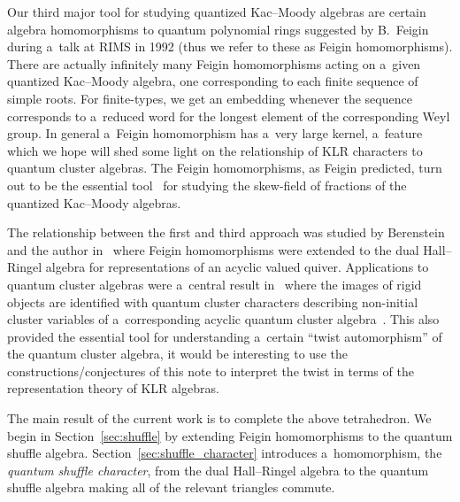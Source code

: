 \documentclass[pdftex]{sigma}
\numberwithin{equation}{section}
\begin{document}
Our third major tool for studying quantized Kac--Moody algebras are certain algebra homomorphisms to quantum polynomial
rings suggested by B.~Feigin during a~talk at RIMS in 1992 (thus we refer to these as Feigin homomorphisms).
There are actually inf\/initely many Feigin homomorphisms acting on a~given quantized Kac--Moody algebra, one
corresponding to each f\/inite sequence of simple roots.
For f\/inite-types, we get an embedding whenever the sequence corresponds to a~reduced word for the longest element of the
corresponding Weyl group.
In general a~Feigin homomorphism has a~very large kernel, a~feature which we hope will shed some light on the
relationship of KLR characters to quantum cluster algebras.
The Feigin homomorphisms, as Feigin predicted, turn out to be the essential tool~\cite{berenstein,iohara-malikov, joseph} for studying the skew-f\/ield of fractions of the quantized Kac--Moody algebras.

The relationship between the f\/irst and third approach was studied by Berenstein and the author
in~\cite{berenstein-rupel} where Feigin homomorphisms were extended to the dual Hall--Ringel algebra for representations  %
of an acyclic valued quiver.
Applications to quantum cluster algebras were a~central result in~\cite{berenstein-rupel} where the images of rigid  %
objects are identif\/ied with quantum cluster characters describing non-initial cluster variables of a~corresponding
acyclic quantum cluster algebra~\cite{qin,rupel1,rupel2}.
This also provided the essential tool for understanding a~certain ``twist automorphism'' of the quantum cluster algebra,
it would be interesting to use the constructions/conjectures of this note to interpret the twist in terms of the
representation theory of KLR algebras.

The main result of the current work is to complete the above tetrahedron.
We begin in Section~\ref{sec:shuffle} by extending Feigin homomorphisms to the quantum shuf\/f\/le algebra.
Section~\ref{sec:shuffle_character} introduces a~homomorphism, the \emph{quantum shuffle character}, from the dual
Hall--Ringel algebra to the quantum shuf\/f\/le algebra making all of the relevant triangles commute.
\end{document}
